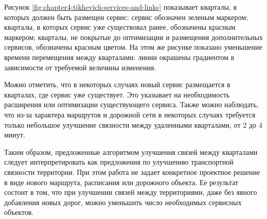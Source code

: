 Рисунок \ref{fig:chapter4-tikhevich-services-and-links} показывает кварталы, в которых должен быть размещен сервис: сервис обозначен зеленым маркером; кварталы, в которых сервис уже существовал ранее, обозначены красным маркером; кварталы, не покрытые до оптимизации и размещения дополнительных сервисов, обозначены красным цветом. На этом же рисунке показано уменьшение времени перемещения между кварталами: линии окрашены градиентом в зависимости от требуемой величины изменения.

Можно отметить, что в некоторых случаях новый сервис размещается в кварталах, где сервис уже существует. Это указывает на необходимость расширения или оптимизации существующего сервиса. Также можно наблюдать, что из-за характера маршрутов и дорожной сети в некоторых случаях требуется только небольшое улучшение связности между удаленными кварталами, от 2 до 4 минут.

Таким образом, предложенные алгоритмом улучшения связей между кварталами следует интерпретировать как предложения по улучшению транспортной связности территории. При этом работа не задает конкретное проектное решение в виде нового маршрута, расписания или дорожного объекта. Ее результат состоит в том, что при улучшении связей между территориями, даже без явного добавления новых дорог, можно уменьшить число необходимых сервисных объектов.

%
%





